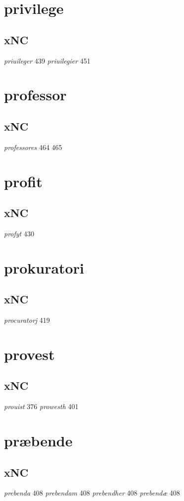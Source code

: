 \documentclass[a4paper,twocolumn]{article}
\begin{document}
\section{privilege}
\label{sec:org627a8cc}
\subsection{xNC}
\label{sec:org6c27812}
\emph{priuileger} 439 \emph{priuilegier} 451 
\section{professor}
\label{sec:org2733650}
\subsection{xNC}
\label{sec:org94dcc69}
\emph{professores} 464 465 
\section{profit}
\label{sec:org00a8699}
\subsection{xNC}
\label{sec:orgc1ce495}
\emph{profyt} 430 
\section{prokuratori}
\label{sec:org9a468ce}
\subsection{xNC}
\label{sec:org8622edd}
\emph{procuratorj} 419 
\section{provest}
\label{sec:org59eaf94}
\subsection{xNC}
\label{sec:orgad77d02}
\emph{prouist} 376 \emph{prowesth} 401 
\section{præbende}
\label{sec:orgead41b6}
\subsection{xNC}
\label{sec:org4a2b3fd}
\emph{prebenda} 408 \emph{prebendam} 408 \emph{prebendher} 408 \emph{prebendæ} 408 
\end{document}

